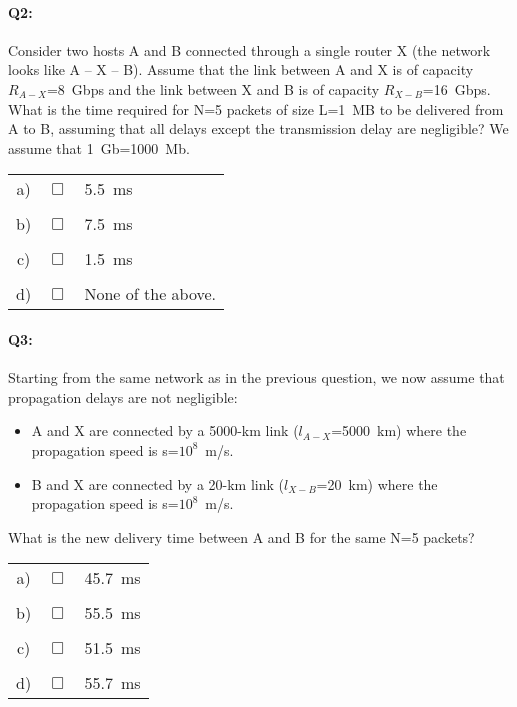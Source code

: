 \documentclass{llncs}
\begin{document}
\paragraph{\textbf{Q2:}} Consider two hosts A and B connected through a single router X (the
  network looks like A -- X -- B). Assume that the link between A and
  X is of capacity $R_{A-X}$=8~Gbps and the link between X and B is of
  capacity $R_{X-B}$=16~Gbps. What is the time required for N=5
  packets of size L=1~MB to be delivered from A to B, assuming that all
  delays except the transmission delay are negligible? We assume that 1~Gb=1000~Mb.\\
  
\begin{tabular}{ccl}
  a) & $\Box$ & 5.5~ms\\
  \\
  b) & $\Box$ & 7.5~ms\\
  \\
  c) & $\Box$ & 1.5~ms\\
  \\
  d) & $\Box$ & None of the above.
\end{tabular}

\paragraph{\textbf{Q3:}} Starting from the same network as in the previous question, we now assume that propagation delays are not negligible:
\begin{itemize}
\item A and X are connected by a 5000-km link ($l_{A-X}$=5000~km) where the propagation speed is s=$10^8$~m/s.
\item B and X are connected by a 20-km link ($l_{X-B}$=20~km) where the propagation speed is s=$10^8$~m/s.
\end{itemize}
What is the new delivery time between A and B for the same N=5 packets?\\

\begin{tabular}{ccl}
  a) & $\Box$ & 45.7~ms\\
  \\
  b) & $\Box$ & 55.5~ms \\
  \\
  c) & $\Box$ & 51.5~ms\\
  \\
  d) & $\Box$ & 55.7~ms
\end{tabular}
\end{document}
